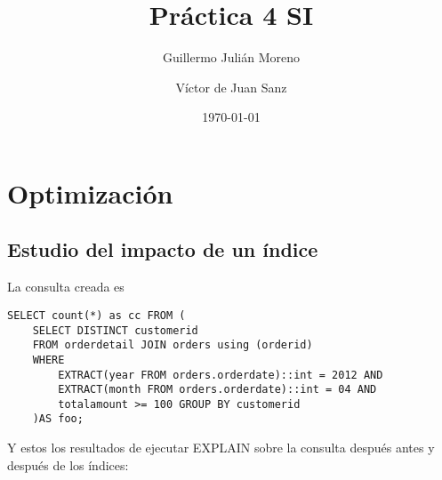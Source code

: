 \documentclass{article}
\title{Práctica 4 SI}
\date{\today}
\author{Guillermo Julián Moreno \and Víctor de Juan Sanz}
\begin{document}
\maketitle

\section{Optimización}

\subsection{Estudio del impacto de un índice}

La consulta creada es 
\begin{Verbatim}[frame = lines]
SELECT count(*) as cc FROM (
	SELECT DISTINCT customerid 
	FROM orderdetail JOIN orders using (orderid) 
	WHERE 
		EXTRACT(year FROM orders.orderdate)::int = 2012 AND 
		EXTRACT(month FROM orders.orderdate)::int = 04 AND 
		totalamount >= 100 GROUP BY customerid
	)AS foo;
\end{Verbatim}

Y estos los resultados de ejecutar EXPLAIN sobre la consulta después antes y después de los índices: 
\end{document}

